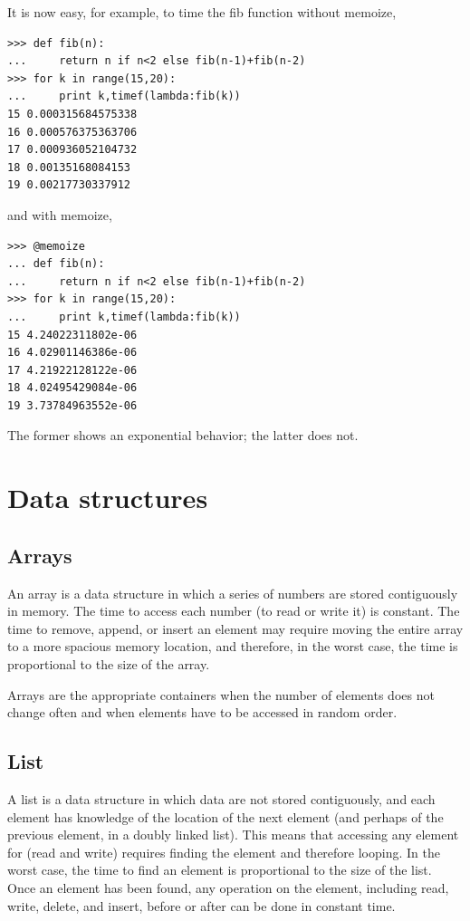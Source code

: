 \documentclass[justified,sixbynine]{tufte-book}
\theoremstyle{plain}%
\theoremstyle{definition}
\theoremstyle{remark}
\begin{document}
\begin{fullwidth}
It is now easy, for example, to time the fib function without memoize,
\begin{lstlisting}
>>> def fib(n):
...     return n if n<2 else fib(n-1)+fib(n-2)
>>> for k in range(15,20):
...     print k,timef(lambda:fib(k))
15 0.000315684575338
16 0.000576375363706
17 0.000936052104732
18 0.00135168084153
19 0.00217730337912
\end{lstlisting}
and with memoize,
\begin{lstlisting}
>>> @memoize
... def fib(n):
...     return n if n<2 else fib(n-1)+fib(n-2)
>>> for k in range(15,20):
...     print k,timef(lambda:fib(k))
15 4.24022311802e-06
16 4.02901146386e-06
17 4.21922128122e-06
18 4.02495429084e-06
19 3.73784963552e-06
\end{lstlisting}

The former shows an exponential behavior; the latter does not.

\goodbreak\section{Data structures}

\goodbreak\subsection{Arrays}

An array is a data structure in which a series of numbers are stored contiguously in memory. The time to access each number (to read or write it) is constant. The time to remove, append, or insert an element may require moving the entire array to a more spacious memory location, and therefore, in the worst case, the time is proportional to the size of the array.

Arrays are the appropriate containers when the number of elements does not change often and when elements have to be accessed in random order.

\goodbreak\subsection{List}

A list is a data structure in which data are not stored contiguously, and each element has knowledge of the location of the next element (and perhaps of the previous element, in a doubly linked list). This means that accessing any element for (read and write) requires finding the element and therefore looping. In the worst case, the time to find an element is proportional to the size of the list. Once an element has been found, any operation on the element, including read, write, delete, and insert, before or after can be done in constant time.


\end{fullwidth}
\end{document}
